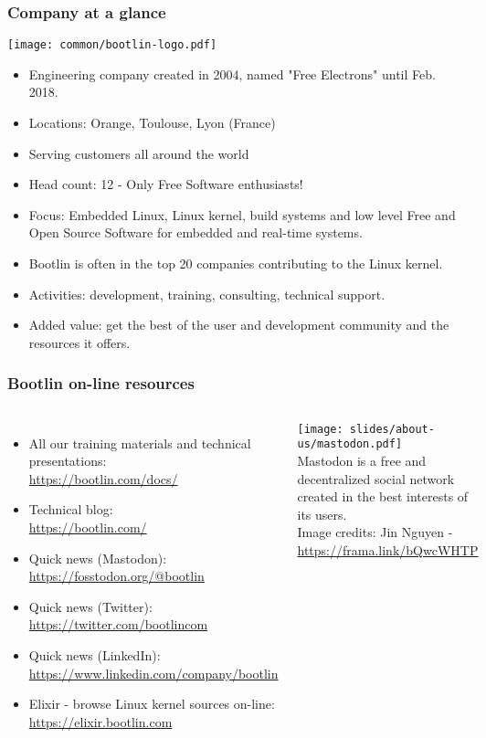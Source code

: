 \begin{frame}
\frametitle{Company at a glance}
  \texttt{[image: common/bootlin-logo.pdf]}
  \begin{itemize}
    \item Engineering company created in 2004, named "Free Electrons" until Feb. 2018.
    \item Locations: Orange, Toulouse, Lyon (France)
    \item Serving customers all around the world
    \item Head count: 12 - Only Free Software enthusiasts!
    \item Focus: Embedded Linux, Linux kernel,
          build systems and low level Free and Open Source Software
          for embedded and real-time systems.
    \item Bootlin is often in the top 20 companies
	  contributing to the Linux kernel.
    \item Activities: development, training, consulting, technical
          support.
    \item Added value: get the best of the user and development
          community and the resources it offers.
  \end{itemize}
\end{frame}

\begin{frame}
\frametitle{Bootlin on-line resources}
\begin{columns}
  \begin{itemize}
    \item All our training materials and technical presentations:\\
          \url{https://bootlin.com/docs/}
    \item Technical blog:\\
          \url{https://bootlin.com/}
    \item Quick news (Mastodon):\\
          \url{https://fosstodon.org/@bootlin}
    \item Quick news (Twitter):\\
          \url{https://twitter.com/bootlincom}
    \item Quick news (LinkedIn):\\
	  \url{https://www.linkedin.com/company/bootlin}
    \item Elixir - browse Linux kernel sources on-line:\\
          \url{https://elixir.bootlin.com}
  \end{itemize}
  \texttt{[image: slides/about-us/mastodon.pdf]}\\
  \vspace{3cm}
  \small Mastodon is a free and decentralized social network created
  in the best interests of its users.\\
  \vspace{0.5cm}
  \tiny Image credits: Jin Nguyen - \url{https://frama.link/bQwcWHTP}
\end{columns}
\end{frame}
